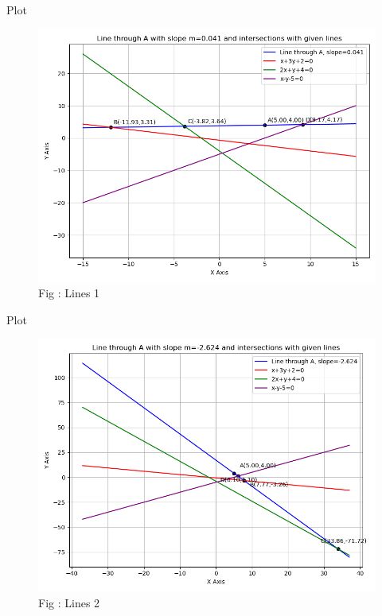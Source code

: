 \documentclass{beamer}
\numberwithin{equation}{section}
\theoremstyle{remark}
\begin{document}
\begin{frame}{Plot}

\begin{figure}[h!]
  \centering
  \includegraphics[width=0.8\columnwidth]{figs/lines_1.png} 
   \caption*{Fig : Lines 1}
  \label{Fig1}
\end{figure}

\end{frame}

\begin{frame}{Plot}

\begin{figure}[h!]
  \centering
  \includegraphics[width=0.8\columnwidth]{figs/lines_2.png} 
   \caption*{Fig : Lines 2}
  \label{Fig2}
\end{figure}

\end{frame}
\end{document}
